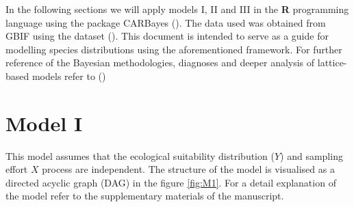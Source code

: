 \documentclass[11pt]{article}
\begin{document}
In the following sections we will apply models I, II and III in the \textbf{R} programming language using the package CARBayes (\cite{Lee2013}). The data used was obtained from GBIF using the dataset (\cite{gbifmexdata}). This document is intended to serve as a guide for modelling species distributions using the aforementioned framework. For further reference of the Bayesian methodologies, diagnoses and deeper analysis of lattice-based models refer to (\cite{Lee2013,Rue2005})

\section{Model I}
\label{sec:org7ed75fb}

This model assumes that the ecological suitability distribution (\(Y\)) and sampling effort \(X\) process are independent. The structure of the model is visualised as a directed acyclic graph (DAG) in the figure \ref{fig:M1}.  For a detail explanation of the model refer to the supplementary materials of the manuscript.
\end{document}
